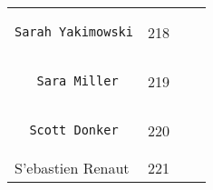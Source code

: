 \documentclass[]{article}
\begin{document}
\begin{longtable}[c]{@{}llll@{}}
\begin{minipage}[t]{0.39\columnwidth}
\begin{verbatim}
Sarah Yakimowski
\end{verbatim}
\end{minipage} & \begin{minipage}[t]{0.10\columnwidth}\raggedright
218
\end{minipage} & \begin{minipage}[t]{0.13\columnwidth}\raggedright
\end{minipage} & \begin{minipage}[t]{0.15\columnwidth}\raggedright
\end{minipage}
\\\noalign{\medskip}
\begin{minipage}[t]{0.39\columnwidth}\raggedright
\begin{verbatim}
   Sara Miller
\end{verbatim}
\end{minipage} & \begin{minipage}[t]{0.10\columnwidth}\raggedright
219
\end{minipage} & \begin{minipage}[t]{0.13\columnwidth}\raggedright
\end{minipage} & \begin{minipage}[t]{0.15\columnwidth}\raggedright
\end{minipage}
\\\noalign{\medskip}
\begin{minipage}[t]{0.39\columnwidth}\raggedright
\begin{verbatim}
  Scott Donker
\end{verbatim}
\end{minipage} & \begin{minipage}[t]{0.10\columnwidth}\raggedright
220
\end{minipage} & \begin{minipage}[t]{0.13\columnwidth}\raggedright
\end{minipage} & \begin{minipage}[t]{0.15\columnwidth}\raggedright
\end{minipage}
\\\noalign{\medskip}
\begin{minipage}[t]{0.39\columnwidth}\raggedright
S'ebastien Renaut
\end{minipage} & \begin{minipage}[t]{0.10\columnwidth}\raggedright
221
\end{minipage} & \begin{minipage}[t]{0.13\columnwidth}\raggedright

\end{minipage}
\end{longtable}
\end{document}
